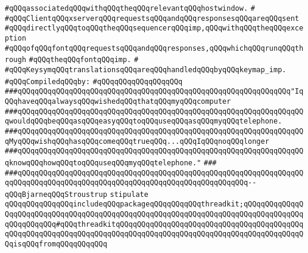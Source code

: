\verb|#qQQqassociatedqQQqwithqQQqtheqQQqrelevantqQQqhostwindow.|\newline
\verb|#|\newline
\verb|#qQQqClientqQQqxserverqQQqrequestsqQQqandqQQqresponsesqQQqareqQQqsent|\newline
\verb|#qQQqdirectlyqQQqtoqQQqtheqQQqsequencerqQQqimp,qQQqwithqQQqtheqQQqexception|\newline
\verb|#qQQqofqQQqfontqQQqrequestsqQQqandqQQqresponses,qQQqwhichqQQqrunqQQqthrough|\newline
\verb|#qQQqtheqQQqfontqQQqimp.|\newline
\verb|#|\newline
\verb|#qQQqKeysymqQQqtranslationsqQQqareqQQqhandledqQQqbyqQQqkeymap_imp.|\newline
\newline
\verb|#qQQqCompiledqQQqby:|\newline
\verb|#qQQqqQQqqQQqqQQqqQQq|\newline
\newline
\newline
\newline
\newline
\newline
\verb|###qQQqqQQqqQQqqQQqqQQqqQQqqQQqqQQqqQQqqQQqqQQqqQQqqQQqqQQqqQQqqQQq"IqQQqhaveqQQqalwaysqQQqwishedqQQqthatqQQqmyqQQqcomputer|\newline
\verb|###qQQqqQQqqQQqqQQqqQQqqQQqqQQqqQQqqQQqqQQqqQQqqQQqqQQqqQQqqQQqqQQqqQQqwouldqQQqbeqQQqasqQQqeasyqQQqtoqQQquseqQQqasqQQqmyqQQqtelephone.|\newline
\verb|###qQQqqQQqqQQqqQQqqQQqqQQqqQQqqQQqqQQqqQQqqQQqqQQqqQQqqQQqqQQqqQQqqQQqMyqQQqwishqQQqhasqQQqcomeqQQqtrueqQQq...qQQqIqQQqnoqQQqlonger|\newline
\verb|###qQQqqQQqqQQqqQQqqQQqqQQqqQQqqQQqqQQqqQQqqQQqqQQqqQQqqQQqqQQqqQQqqQQqknowqQQqhowqQQqtoqQQquseqQQqmyqQQqtelephone."|\newline
\verb|###|\newline
\verb|###qQQqqQQqqQQqqQQqqQQqqQQqqQQqqQQqqQQqqQQqqQQqqQQqqQQqqQQqqQQqqQQqqQQqqQQqqQQqqQQqqQQqqQQqqQQqqQQqqQQqqQQqqQQqqQQqqQQqqQQqqQQq--qQQqBjarneqQQqStroustrup|\newline
\newline
\newline
\newline
\verb|stipulate|\newline
\verb|qQQqqQQqqQQqqQQqincludeqQQqpackageqQQqqQQqqQQqthreadkit;qQQqqQQqqQQqqQQqqQQqqQQqqQQqqQQqqQQqqQQqqQQqqQQqqQQqqQQqqQQqqQQqqQQqqQQqqQQqqQQqqQQqqQQqqQQqqQQq#qQQqthreadkitqQQqqQQqqQQqqQQqqQQqqQQqqQQqqQQqqQQqqQQqqQQqqQQqqQQqqQQqqQQqqQQqqQQqqQQqqQQqqQQqqQQqqQQqqQQqqQQqqQQqqQQqqQQqqQQqqQQqisqQQqfromqQQqqQQqqQQq|\newline
